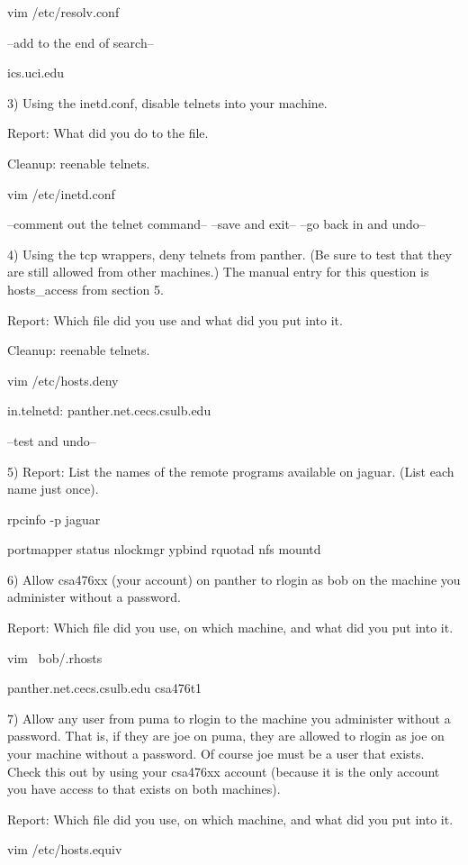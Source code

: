 vim /etc/resolv.conf

--add to the end of search--

ics.uci.edu


3) Using the {\ltt{}inetd.conf}, disable telnets into your machine.

Report: What did you do to the file.

Cleanup: reenable telnets.

vim /etc/inetd.conf

--comment out the telnet command--
--save and exit--
--go back in and undo--

4) Using the tcp wrappers, deny telnets from {\ltt{}panther}. (Be sure to test
that they are still allowed from other machines.)
The manual entry for this question is {\ltt{}hosts_access} from section 5.

Report: Which file did you use and what did you put into it.

Cleanup: reenable telnets.

vim /etc/hosts.deny

in.telnetd: panther.net.cecs.csulb.edu

--test and undo--


5) Report: List the names of the remote programs available on {\ltt{}jaguar}.
(List each name just once).

rpcinfo -p jaguar

portmapper
status
nlockmgr
ypbind
rquotad
nfs
mountd

6) Allow {\ltt{}csa476xx} (your account) on {\ltt{}panther} to rlogin as 
{\ltt{}bob} on the machine you administer without a password.

Report: Which file did you use, on which machine, and what did you put into it.

vim ~bob/.rhosts

panther.net.cecs.csulb.edu csa476t1

7) Allow any user from {\ltt{}puma} to rlogin to the machine you administer 
without a password.
That is, if they are {\ltt{}joe} on {\ltt{}puma}, they are allowed to
rlogin as {\ltt{}joe} on your machine without a password.
Of course {\ltt{}joe} must be  a user that exists.
Check this out by using your {\ltt{}csa476xx} account (because it is the only
account you have access to that exists on both machines).

Report: Which file did you use, on which machine, and what did you put into it.

vim /etc/hosts.equiv

